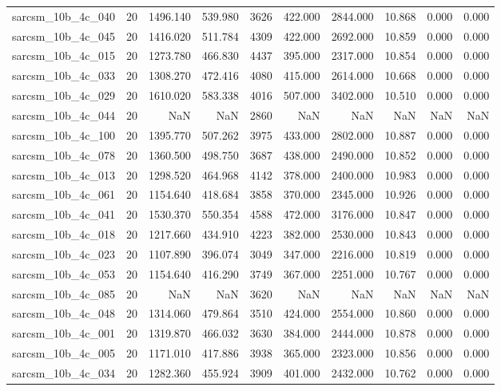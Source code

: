 \begin{tabular}{lrrrrrrrrr}
sarcsm\_10b\_4c\_040 & 20 & 1496.140 & 539.980 & 3626 & 422.000 & 2844.000 & 10.868 & 0.000 & 0.000 \\
sarcsm\_10b\_4c\_045 & 20 & 1416.020 & 511.784 & 4309 & 422.000 & 2692.000 & 10.859 & 0.000 & 0.000 \\
sarcsm\_10b\_4c\_015 & 20 & 1273.780 & 466.830 & 4437 & 395.000 & 2317.000 & 10.854 & 0.000 & 0.000 \\
sarcsm\_10b\_4c\_033 & 20 & 1308.270 & 472.416 & 4080 & 415.000 & 2614.000 & 10.668 & 0.000 & 0.000 \\
sarcsm\_10b\_4c\_029 & 20 & 1610.020 & 583.338 & 4016 & 507.000 & 3402.000 & 10.510 & 0.000 & 0.000 \\
sarcsm\_10b\_4c\_044 & 20 & NaN & NaN & 2860 & NaN & NaN & NaN & NaN & NaN \\
sarcsm\_10b\_4c\_100 & 20 & 1395.770 & 507.262 & 3975 & 433.000 & 2802.000 & 10.887 & 0.000 & 0.000 \\
sarcsm\_10b\_4c\_078 & 20 & 1360.500 & 498.750 & 3687 & 438.000 & 2490.000 & 10.852 & 0.000 & 0.000 \\
sarcsm\_10b\_4c\_013 & 20 & 1298.520 & 464.968 & 4142 & 378.000 & 2400.000 & 10.983 & 0.000 & 0.000 \\
sarcsm\_10b\_4c\_061 & 20 & 1154.640 & 418.684 & 3858 & 370.000 & 2345.000 & 10.926 & 0.000 & 0.000 \\
sarcsm\_10b\_4c\_041 & 20 & 1530.370 & 550.354 & 4588 & 472.000 & 3176.000 & 10.847 & 0.000 & 0.000 \\
sarcsm\_10b\_4c\_018 & 20 & 1217.660 & 434.910 & 4223 & 382.000 & 2530.000 & 10.843 & 0.000 & 0.000 \\
sarcsm\_10b\_4c\_023 & 20 & 1107.890 & 396.074 & 3049 & 347.000 & 2216.000 & 10.819 & 0.000 & 0.000 \\
sarcsm\_10b\_4c\_053 & 20 & 1154.640 & 416.290 & 3749 & 367.000 & 2251.000 & 10.767 & 0.000 & 0.000 \\
sarcsm\_10b\_4c\_085 & 20 & NaN & NaN & 3620 & NaN & NaN & NaN & NaN & NaN \\
sarcsm\_10b\_4c\_048 & 20 & 1314.060 & 479.864 & 3510 & 424.000 & 2554.000 & 10.860 & 0.000 & 0.000 \\
sarcsm\_10b\_4c\_001 & 20 & 1319.870 & 466.032 & 3630 & 384.000 & 2444.000 & 10.878 & 0.000 & 0.000 \\
sarcsm\_10b\_4c\_005 & 20 & 1171.010 & 417.886 & 3938 & 365.000 & 2323.000 & 10.856 & 0.000 & 0.000 \\
sarcsm\_10b\_4c\_034 & 20 & 1282.360 & 455.924 & 3909 & 401.000 & 2432.000 & 10.762 & 0.000 & 0.000 \\

\end{tabular}
